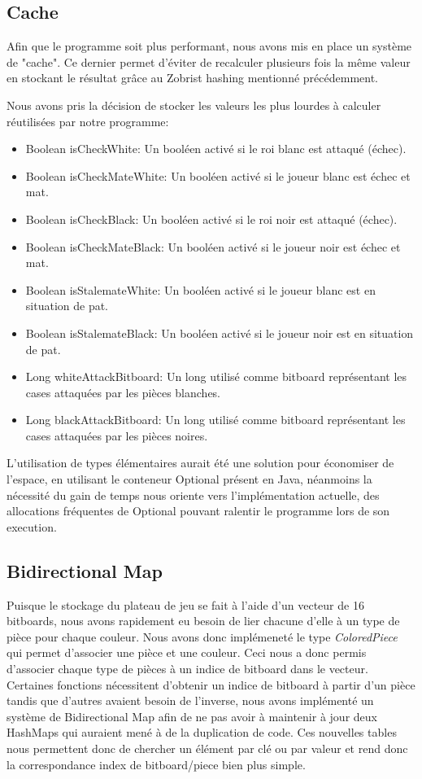 \documentclass{article}
\begin{document}
\subsection{Cache}
Afin que le programme soit plus performant, nous avons mis en place un système de "cache". Ce dernier permet d'éviter de recalculer plusieurs fois la même valeur en stockant le résultat grâce au Zobrist hashing mentionné précédemment.

Nous avons pris la décision de stocker les valeurs les plus lourdes à calculer réutilisées par notre programme:
\begin{itemize}
    \item Boolean isCheckWhite: Un booléen activé si le roi blanc est attaqué (échec).
    \item Boolean isCheckMateWhite: Un booléen activé si le joueur blanc est échec et mat.
    \item Boolean isCheckBlack: Un booléen activé si le roi noir est attaqué (échec).
    \item Boolean isCheckMateBlack: Un booléen activé si le joueur noir est échec et mat.
    \item Boolean isStalemateWhite: Un booléen activé si le joueur blanc est en situation de pat.
    \item Boolean isStalemateBlack: Un booléen activé si le joueur noir est en situation de pat.
    \item Long whiteAttackBitboard: Un long utilisé comme bitboard représentant les cases attaquées par les pièces blanches.
    \item Long blackAttackBitboard: Un long utilisé comme bitboard représentant les cases attaquées par les pièces noires.
\end{itemize}

L'utilisation de types élémentaires aurait été une solution pour économiser de l'espace, en utilisant le conteneur Optional présent en Java, néanmoins la nécessité du gain de temps nous oriente vers l'implémentation actuelle, des allocations fréquentes de Optional pouvant ralentir le programme lors de son execution.

\subsection{Bidirectional Map}
Puisque le stockage du plateau de jeu se fait à l'aide d'un vecteur de 16 bitboards, nous avons rapidement eu besoin de lier chacune d'elle à un type de pièce pour chaque couleur.
Nous avons donc implémeneté le type \textit{ColoredPiece} qui permet d'associer une pièce et une couleur. Ceci nous a donc permis d'associer chaque type de pièces à un indice
de bitboard dans le vecteur. Certaines fonctions nécessitent d'obtenir un indice de bitboard à partir d'un pièce tandis que d'autres avaient besoin de l'inverse, nous avons implémenté un système
de Bidirectional Map afin de ne pas avoir à maintenir à jour deux HashMaps qui auraient mené à de la duplication de code. Ces nouvelles tables nous permettent donc de chercher un élément par clé ou par valeur et rend donc la
correspondance index de bitboard/piece bien plus simple.
\end{document}
